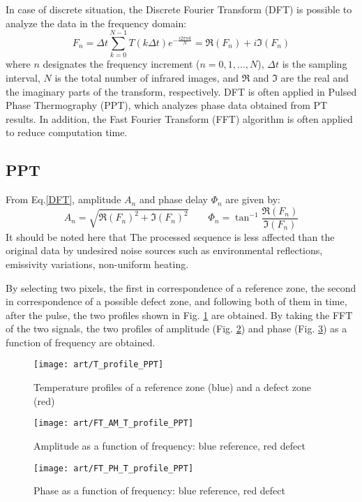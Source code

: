 In case of discrete situation, the Discrete Fourier Transform (DFT) is possible to analyze the data in the frequency domain:
\begin{equation}
F_n = \Delta t \sum_{k=0}^{N-1}T(k\Delta t)e^{-\tfrac{i2\pi nk}{N}} = \Re(F_n) + i\Im(F_n)
\label{DFT}
\end{equation}
where $n$ designates the frequency increment ($n=0, 1, ..., N$), $\Delta t$ is the sampling interval, $N$ is the total number of infrared images, and $\Re$ and $\Im$ are the real and the imaginary parts of the transform, respectively.
DFT is often applied in Pulsed Phase Thermography (PPT), which analyzes phase data obtained from PT results. In addition, the Fast Fourier Transform (FFT) algorithm is often applied to reduce computation time.

\subsection{PPT}
From Eq.\ref{DFT}, amplitude $A_n$ and phase delay $\Phi_n$ are given by:
\begin{equation}
A_n = \sqrt{\Re(F_n)^2 + \Im(F_n)^2} \qquad \Phi_n = \tan^{-1}\frac{\Re(F_n)}{\Im(F_n)}
\end{equation}
It should be noted here that The processed sequence is less affected than the original data by undesired noise
sources such as environmental reflections, emissivity variations, non-uniform heating.

By selecting two pixels, the first in correspondence of a reference zone, the second in correspondence of a possible defect zone, and following both of them in time, after the pulse, the two profiles shown in Fig. \ref{T_profile_PPT} are obtained. By taking the FFT of the two signals, the two profiles of amplitude (Fig. \ref{FT_AM_profile_PPT}) and phase (Fig. \ref{FT_PH_profile_PPT})
as a function of frequency are obtained.
\begin{figure}[!h]
	\centering
	\texttt{[image: art/T\_profile\_PPT]}
	\caption{Temperature profiles of a reference zone (blue) and a defect zone (red)}
	\label{T_profile_PPT}
\end{figure}

\begin{figure}[!h]
	\centering
	\texttt{[image: art/FT\_AM\_T\_profile\_PPT]}
	\caption{Amplitude as a function of frequency: blue reference, red defect}
	\label{FT_AM_profile_PPT}
\end{figure}

\begin{figure}[!h]
	\centering
	\texttt{[image: art/FT\_PH\_T\_profile\_PPT]}
	\caption{Phase as a function of frequency: blue reference, red defect}
	\label{FT_PH_profile_PPT}
\end{figure}


